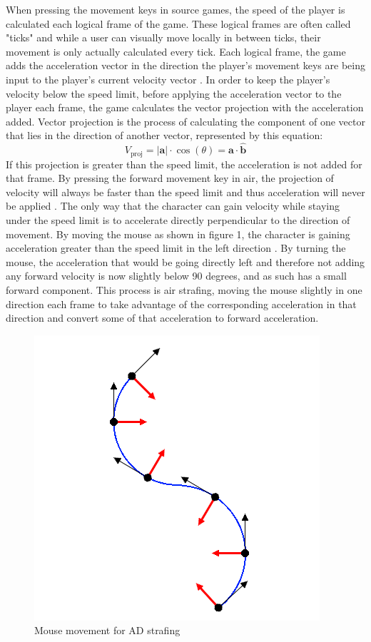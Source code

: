 \documentclass[10pt,twocolumn]{article}
\begin{document}
When pressing the movement keys in source games, the speed of the player is calculated each logical frame of the game. These logical frames are often called "ticks" and while a user can visually move locally in between ticks, their movement is only actually calculated every tick. Each logical frame, the game adds the acceleration vector in the direction the player's movement keys are being input to the player's current velocity vector \cite{BunnyHoppingProgrammers}. In order to keep the player's velocity below the speed limit, before applying the acceleration vector to the player each frame, the game calculates the vector projection with the acceleration added. Vector projection is the process of calculating the component of one vector that lies in the direction of another vector, represented by this equation: \[ V_{\text{proj}} = |\mathbf{a}| \cdot \cos(\theta) = \mathbf{a} \cdot \hat{\mathbf{b}} \] If this projection is greater than the speed limit, the acceleration is not added for that frame. By pressing the forward movement key in air, the projection of velocity will always be faster than the speed limit and thus acceleration will never be applied \cite{MoreSteamAirstrafe}. The only way that the character can gain velocity while staying under the speed limit is to accelerate directly perpendicular to the direction of movement. By moving the mouse as shown in figure 1, the character is gaining acceleration greater than the speed limit in the left direction \cite{MoreSteamAirstrafe}. By turning the mouse, the acceleration that would be going directly left and therefore not adding any forward velocity is now slightly below 90 degrees, and as such has a small forward component. This process is air strafing, moving the mouse slightly in one direction each frame to take advantage of the corresponding acceleration in that direction and convert some of that acceleration to forward acceleration.

\begin{figure}
    \centering
    \includegraphics[width=0.5\linewidth]{figure1.png}
    \caption{Mouse movement for AD strafing \cite{MoreSteamAirstrafe}}
\end{figure}
\end{document}
